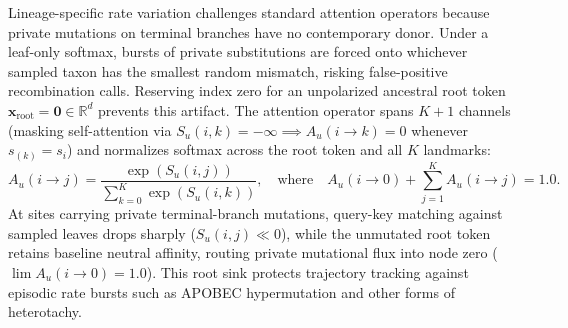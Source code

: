 Lineage-specific rate variation challenges standard attention operators because private mutations on terminal branches have no contemporary donor. Under a leaf-only softmax, bursts of private substitutions are forced onto whichever sampled taxon has the smallest random mismatch, risking false-positive recombination calls. Reserving index zero for an unpolarized ancestral root token $\mathbf{x}_{\text{root}} = \mathbf{0} \in \mathbb{R}^d$ prevents this artifact. The attention operator spans $K+1$ channels (masking self-attention via $S_u(i, k) = -\infty \implies A_u(i \to k) = 0$ whenever $s_{(k)} = s_i$) and normalizes softmax across the root token and all $K$ landmarks:
\begin{equation}
A_u(i \to j) = \frac{\exp(S_u(i, j))}{\sum_{k=0}^K \exp(S_u(i, k))}, \quad \text{where} \quad A_u(i \to 0) + \sum_{j=1}^K A_u(i \to j) = 1.0.
\label{eq:methods_root_softmax}
\end{equation}
At sites carrying private terminal-branch mutations, query-key matching against sampled leaves drops sharply ($S_u(i, j) \ll 0$), while the unmutated root token retains baseline neutral affinity, routing private mutational flux into node zero ($\lim A_u(i \to 0) = 1.0$). This root sink protects trajectory tracking against episodic rate bursts such as APOBEC hypermutation and other forms of heterotachy.

